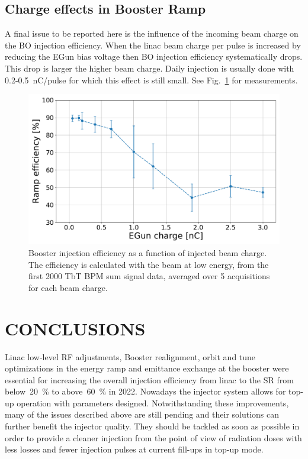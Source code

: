 \documentclass[a4paper,
               keeplastbox,   %
               ]{jacow}
\begin{document}
\subsection{Charge effects in Booster Ramp}

A final issue to be reported here is the influence of the incoming beam charge on the BO injection efficiency. When the linac beam charge per pulse is increased by reducing the EGun bias voltage then BO injection efficiency systematically drops. This drop is larger the higher beam charge. Daily injection is usually done with 0.2-\SI{0.5}{\nano\coulomb}/pulse for which this effect is still small. See Fig.~\ref{fig:bo-inj-impedance} for measurements.

\begin{figure}[!htb]
   \centering
   \includegraphics*[width=.9\columnwidth]{THPOPT038_f6.pdf}
   \caption{Booster injection efficiency as a function of injected beam charge. The efficiency is calculated with the beam at low energy, from the first 2000 TbT BPM sum signal data, averaged over 5 acquisitions for each beam charge.}
   \label{fig:bo-inj-impedance}
\end{figure}

\section{CONCLUSIONS}

Linac low-level RF adjustments, Booster realignment, orbit and tune optimizations in the energy ramp and emittance exchange at the booster were essential for increasing the overall injection efficiency from linac to the SR from below~\SI{20}{\percent} to above~\SI{60}{\percent} in 2022. Nowadays the injector system allows for top-up operation with parameters designed. Notwithstanding these improvements, many of the issues described above are still pending and their solutions can further benefit the injector quality. They should be tackled as soon as possible in order to provide a cleaner injection from the point of view of radiation doses with less losses and fewer injection pulses at current fill-ups in top-up mode.
\end{document}
